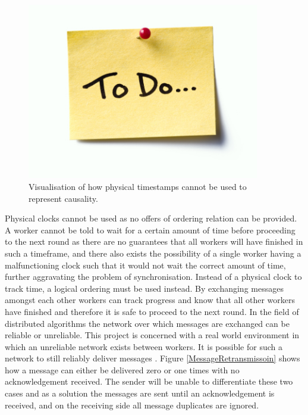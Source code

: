 \documentclass[12pt]{article}
\begin{document}
\begin{figure}[H]
  \centering
  \includegraphics[width=4in]{todo}
  \caption[]{Visualisation of how physical timestamps cannot be used to represent causality.}
  \label{PhysicalTimestamps}
\end{figure}

Physical clocks cannot be used as no offers of ordering relation can be provided. A worker cannot be told to wait for a certain amount of time before proceeding to the next round as there are no guarantees that all workers will have finished in such a timeframe, and there also exists the possibility of a single worker having a malfunctioning clock such that it would not wait the correct amount of time, further aggravating the problem of synchronisation. Instead of a physical clock to track time, a logical ordering must be used instead. By exchanging messages amongst each other workers can track progress and know that all other workers have finished and therefore it is safe to proceed to the next round. In the field of distributed algorithms the network over which messages are exchanged can be reliable or unreliable. This project is concerned with a real world environment in which an unreliable network exists between workers. It is possible for such a network to still reliably deliver messages \cite{afek1994reliable}. Figure \ref{MessageRetransmissoin} shows how a message can either be delivered zero or one times with no acknowledgement received. The sender will be unable to differentiate these two cases and as a solution the messages are sent until an acknowledgement is received, and on the receiving side all message duplicates are ignored.
\end{document}
